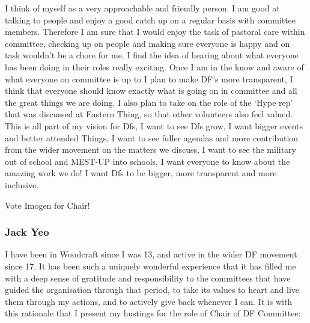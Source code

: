 \documentclass[a4paper, 11pt]{article} %
\begin{document}
\begin{onehalfspacing}
I think of myself as a very approachable and friendly person. I am good at talking to people and enjoy a good catch up on a regular basis with committee members. Therefore I am sure that I would enjoy the task of pastoral care within committee, checking up on people and making sure everyone is happy and on task wouldn't be a chore for me. I find the idea of hearing about what everyone has been doing in their roles really exciting. Once I am in the know and aware of what everyone on committee is up to I plan to make DF's more transparent, I think that everyone should know exactly what is going on in committee and all the great things we are doing. I also plan to take on the role of the `Hype rep' that was discussed at Eastern Thing, so that other volunteers also feel valued. This is all part of my vision for Dfs, I want to see Dfs grow, I want bigger events and better attended Things, I want to see fuller agendas and more contribution from the wider movement on the matters we discuss, I want to see the military out of school and MEST-UP into schools, I want everyone to know about the amazing work we do! I want Dfs to be bigger, more transparent and more inclusive.

Vote Imogen for Chair!

\subsubsection{Jack Yeo}

I have been in Woodcraft since I was 13, and active in the wider DF movement since 17. It has been such a uniquely wonderful experience that it has filled me with a deep sense of gratitude and responsibility to the committees that have guided the organisation through that period, to take its values to heart and live them through my actions, and to actively give back whenever I can. It is with this rationale that I present my hustings for the role of Chair of DF Committee:


\end{onehalfspacing}
\end{document}
